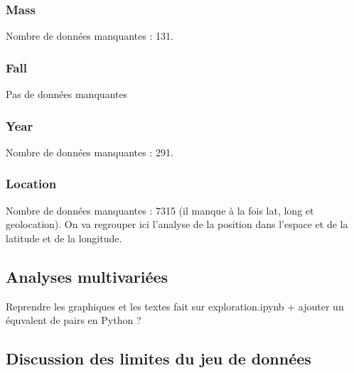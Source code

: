 \documentclass[12pt]{article}
\begin{document}
\subsubsection{Mass}
Nombre de données manquantes : 131.
\subsubsection{Fall}
Pas de données manquantes
\subsubsection{Year}
Nombre de données manquantes : 291.
\subsubsection{Location}
Nombre de données manquantes : 7315 (il manque à la fois lat, long et geolocation). On va regrouper ici l'analyse de la position dans l'espace et de la latitude et de la longitude.

\subsection{Analyses multivariées}
Reprendre les graphiques et les textes fait sur exploration.ipynb + ajouter un équvalent de pairs en Python ?

\subsection{Discussion des limites du jeu de données}
\end{document}
